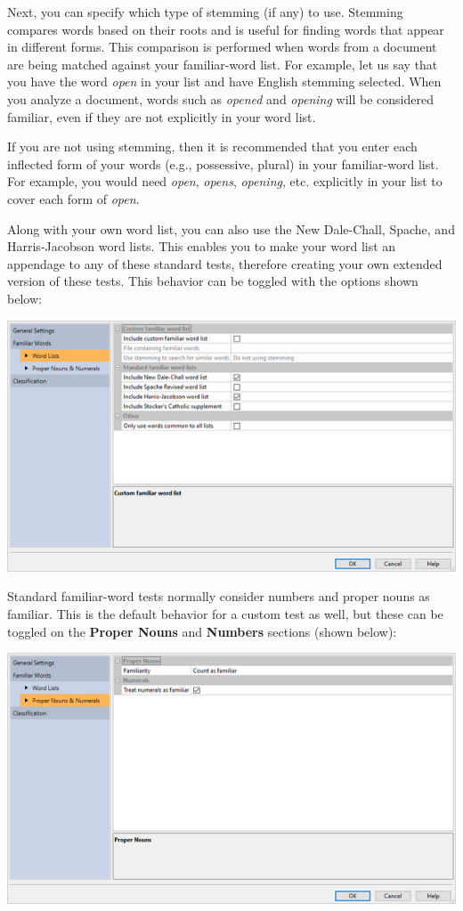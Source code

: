 \documentclass[
]{book}
\theoremstyle{definition}
\theoremstyle{definition}
\theoremstyle{definition}
\theoremstyle{definition}
\theoremstyle{remark}
\begin{document}
Next, you can specify which type of stemming (if any) to use. Stemming compares words based on their roots and is useful for finding words that appear in different forms. This comparison is performed when words from a document are being matched against your familiar-word list. For example, let us say that you have the word \emph{open} in your list and have English stemming selected. When you analyze a document, words such as \emph{opened} and \emph{opening} will be considered familiar, even if they are not explicitly in your word list.

If you are not using stemming, then it is recommended that you enter each inflected form of your words (e.g., possessive, plural) in your familiar-word list. For example, you would need \emph{open}, \emph{opens}, \emph{opening}, etc. explicitly in your list to cover each form of \emph{open}.

Along with your own word list, you can also use the New Dale-Chall, Spache, and Harris-Jacobson word lists. This enables you to make your word list an appendage to any of these standard tests, therefore creating your own extended version of these tests. This behavior can be toggled with the options shown below:

\includegraphics{Images/CustomTestIncludeLists.png}

Standard familiar-word tests normally consider numbers and proper nouns as familiar. This is the default behavior for a custom test as well, but these can be toggled on the \textbf{Proper Nouns} and \textbf{Numbers} sections (shown below):

\includegraphics{Images/CustomTestTreat.png}
\end{document}

